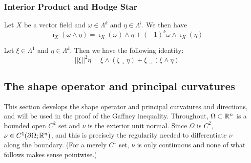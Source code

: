 \subsubsection{Interior Product and Hodge Star}

\begin{theorem}
    Let $X$ be a vector field and $\omega\in \Lambda^k$ and $\eta\in \Lambda^l$. We then have \begin{equation}\imath_X(\omega \wedge \eta)=\imath_X(\omega)\wedge \eta+ (-1)^k \omega \wedge \imath_X(\eta)\end{equation}
\end{theorem}
\begin{corollary}
{Let $\xi\in \Lambda^1$ and $\eta\in \Lambda^k$. Then we have the following identity:
\begin{equation}
    ||\xi||^2\eta=\xi\wedge(\xi\lrcorner \eta)+\xi\lrcorner(\xi\wedge \eta)
\end{equation}
}
    
\end{corollary}

\subsection{The shape operator and principal curvatures}\label{sec:shape_operator}
This section develops the shape operator and principal curvatures and directions, and will be used in the proof of the Gaffney inequality. Throughout, $\Omega\subset\mathbb{R}^n$ is a bounded open $C^2$ set and $\nu$ is the exterior unit normal. Since $\Omega$ is $C^2$, $\nu\in C^1(\partial\Omega;\mathbb{R}^n)$, and this is precisely the regularity needed to differentiate $\nu$ along the boundary. (For a merely $C^1$ set, $\nu$ is only continuous and none of what follows makes sense pointwise.)

